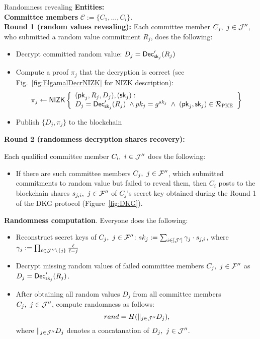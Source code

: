 \begin{boxfig}{\label{fig:rand_reveal}Randomness revealing}{}
\footnotesize
\textbf{Entities:}\\
    \hspace*{6mm} \textbf{Committee members} $\mathcal{C}:=\{C_1,\ldots, C_l \}$.\\

\textbf{Round 1 (random values revealing):}
Each committee member $C_j,\ j\in\JJJ''$, who submitted a random value commitment $R_j$, does the following:
\begin{itemize}
    \item Decrypt committed random value: $D_j=\mathsf{Dec}'_{\mathsf{sk}_j}(R_j)$
    \item Compute a proof $\pi_{j}$ that the decryption is correct (see Fig.~\ref{fig:ElgamalDecrNIZK} for NIZK description):
    \begin{equation*}
        \pi_{j}\leftarrow\mathsf{NIZK}\left\{\begin{array}{l} (\mathsf{pk}_j, R_{j}, D_{j}),(\mathsf{sk}_j): \\
         D_j=\mathsf{Dec}'_{\mathsf{sk}_j}(R_j) \; \wedge pk_j=g^{sk_j} \; \wedge \;  (\mathsf{pk}_j,\mathsf{sk}_j)\in\mathcal{R}_{\textsc{PKE}} \end{array}\right\}
    \end{equation*}

    \item Publish $\{D_{j}, \pi_{j}\}$ to the blockchain\\
\end{itemize}

\textbf{Round 2 (randomness decryption shares recovery):}

Each qualified committee member $C_i,\ i \in \mathcal{J}''$ does the following:
\begin{itemize}
    \item If there are such committee members $C_j,\ j \in \FFF''$, which submitted commitments to random value but failed to reveal them, then $C_i$ posts to the blockchain shares $s_{j,i},\ j \in \mathcal{F}''$ of $C_j$'s secret key obtained during the Round 1 of the DKG protocol (Figure~\ref{fig:DKG}).\\
\end{itemize}

\textbf{Randomness computation}. Everyone does the following:
\begin{itemize}
	\item Reconstruct secret keys of $C_j,\ j\in\FFF''$: $sk_j := \sum_{i\in[\mathcal{J}']} \gamma_{j} \cdot s_{j,i}$, where $\gamma_{j}:= \prod_{\ell\in \mathcal{J}''\setminus \{j\} } \frac{\ell}{\ell-j}$
	\item Decrypt missing random values of failed committee members $C_j,\ j\in\FFF''$ as $D_{j}=\mathsf{Dec}'_{\mathsf{sk}_j}(R_j)$.
	\item After obtaining all random values $D_{j}$ from all committee members $C_j,\ j\in\JJJ''$, compute randomness as follows: \[rand=H(\mathbin\Vert_{j\in\mathcal{J}''} D_j),\]
	where $\mathbin\Vert_{j\in\mathcal{J}''} D_j$ denotes a concatanation of $D_j,~j\in\mathcal{J}''$.
\end{itemize}
\end{boxfig}

